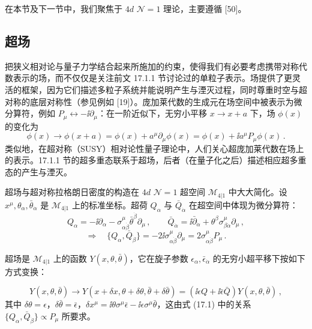 在本节及下一节中，我们聚焦于 $4d$ $\mathcal{N}=1$ 理论，主要遵循 [50]。

\subsection{超场}

把狭义相对论与量子力学结合起来所施加的约束，使得我们有必要考虑携带对称代数表示的场，而不仅仅是关注前文 17.1.1 节讨论过的单粒子表示。场提供了更灵活的框架，因为它们描述多粒子系统并能说明产生与湮灭过程，同时尊重时空与超对称的底层对称性（参见例如 [19]）。庞加莱代数的生成元在场空间中被表示为微分算符，例如 $P_\mu\leftrightarrow-\ii\partial_\mu$：在一阶近似下，无穷小平移 $x\to x+a$ 下，场 $\phi(x)$ 的变化为
\[
\phi(x)\to\phi(x+a)=\phi(x)+a^\mu\partial_\mu\phi(x)=\phi(x)+\ii a^\mu P_\mu\phi(x)\,.
\]
类似地，在超对称（SUSY）相对论性量子理论中，人们关心超庞加莱代数在场上的表示。17.1.1 节的超多重态联系于超场，后者（在量子化之后）描述相应超多重态的产生与湮灭。

超场与超对称拉格朗日密度的构造在 $4d$ $\mathcal{N}=1$ 超空间 $\mathcal{M}_{4|1}$ 中大大简化。设 $x^\mu,\theta_\alpha,\bar\theta_{\dot\alpha}$ 是 $\mathcal{M}_{4|1}$ 上的标准坐标。超荷 $Q_\alpha$ 与 $\bar Q_{\dot\alpha}$ 在超空间中体现为微分算符：
\[
Q_\alpha=-\ii\partial_\alpha-\sigma^\mu_{\alpha\dot\beta}\bar\theta^{\dot\beta}\partial_\mu\,,\qquad
\bar Q_{\dot\alpha}=\ii\bar\partial_{\dot\alpha}+\theta^\beta\sigma^\mu_{\beta\dot\alpha}\partial_\mu\,,
\]
\[
\Rightarrow\quad \{Q_\alpha,\bar Q_{\dot\beta}\}=-2\ii\sigma^\mu_{\alpha\dot\beta}\partial_\mu=2\sigma^\mu_{\alpha\dot\beta}P_\mu\,.
\]

\begin{definition}[17.16] 超场是 $\mathcal{M}_{4|1}$ 上的函数 $Y(x,\theta,\bar\theta)$，它在旋子参数 $\epsilon_\alpha,\bar\epsilon_{\dot\alpha}$ 的无穷小超平移下按如下方式变换：

\[
Y(x,\theta,\bar\theta)\to Y(x+\delta x,\theta+\delta\theta,\bar\theta+\delta\bar\theta)=(\ii\epsilon Q+\ii\bar\epsilon\bar Q)Y(x,\theta,\bar\theta)\,,
\]
其中 $\delta\theta=\epsilon$，$\delta\bar\theta=\bar\epsilon$，$\delta x^\mu=\ii\theta\sigma^\mu\bar\epsilon-\ii\epsilon\sigma^\mu\bar\theta$，这由式 (17.1) 中的关系 $\{Q_\alpha,\bar Q_{\dot\beta}\}\propto P_\mu$ 所要求。\end{definition}

